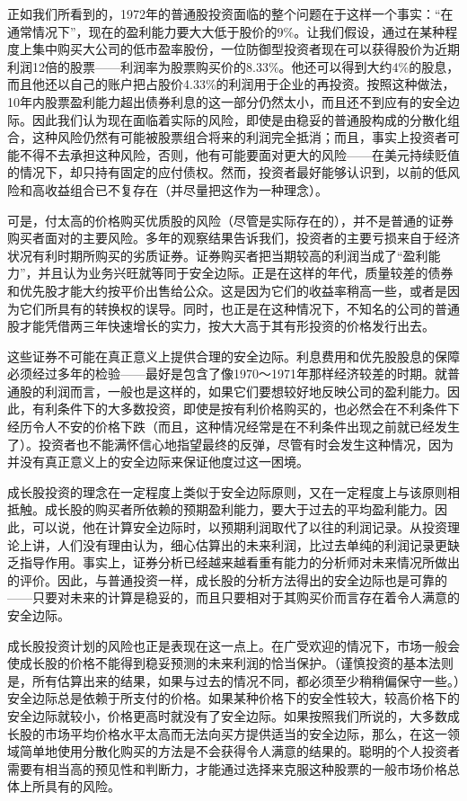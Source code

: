 \documentclass[12pt,oneside]{book}
\begin{document}
正如我们所看到的，1972年的普通股投资面临的整个问题在于这样一个事实：“在通常情况下”，现在的盈利能力要大大低于股价的9\%。让我们假设，通过在某种程度上集中购买大公司的低市盈率股份，一位防御型投资者现在可以获得股价为近期利润12倍的股票——利润率为股票购买价的8.33\%。他还可以得到大约4\%的股息，而且他还以自己的账户把占股价4.33\%的利润用于企业的再投资。按照这种做法，10年内股票盈利能力超出债券利息的这一部分仍然太小，而且还不到应有的安全边际。因此我们认为现在面临着实际的风险，即使是由稳妥的普通股构成的分散化组合，这种风险仍然有可能被股票组合将来的利润完全抵消；而且，事实上投资者可能不得不去承担这种风险，否则，他有可能要面对更大的风险——在美元持续贬值的情况下，却只持有固定的应付债权。然而，投资者最好能够认识到，以前的低风险和高收益组合已不复存在（并尽量把这作为一种理念）。

可是，付太高的价格购买优质股的风险（尽管是实际存在的），并不是普通的证券购买者面对的主要风险。多年的观察结果告诉我们，投资者的主要亏损来自于经济状况有利时期所购买的劣质证券。证券购买者把当期较高的利润当成了“盈利能力”，并且认为业务兴旺就等同于安全边际。正是在这样的年代，质量较差的债券和优先股才能大约按平价出售给公众。这是因为它们的收益率稍高一些，或者是因为它们所具有的转换权的误导。同时，也正是在这种情况下，不知名的公司的普通股才能凭借两三年快速增长的实力，按大大高于其有形投资的价格发行出去。

这些证券不可能在真正意义上提供合理的安全边际。利息费用和优先股股息的保障必须经过多年的检验——最好是包含了像1970～1971年那样经济较差的时期。就普通股的利润而言，一般也是这样的，如果它们要想较好地反映公司的盈利能力。因此，有利条件下的大多数投资，即使是按有利价格购买的，也必然会在不利条件下经历令人不安的价格下跌（而且，这种情况经常是在不利条件出现之前就已经发生了）。投资者也不能满怀信心地指望最终的反弹，尽管有时会发生这种情况，因为并没有真正意义上的安全边际来保证他度过这一困境。

成长股投资的理念在一定程度上类似于安全边际原则，又在一定程度上与该原则相抵触。成长股的购买者所依赖的预期盈利能力，要大于过去的平均盈利能力。因此，可以说，他在计算安全边际时，以预期利润取代了以往的利润记录。从投资理论上讲，人们没有理由认为，细心估算出的未来利润，比过去单纯的利润记录更缺乏指导作用。事实上，证券分析已经越来越看重有能力的分析师对未来情况所做出的评价。因此，与普通投资一样，成长股的分析方法得出的安全边际也是可靠的——只要对未来的计算是稳妥的，而且只要相对于其购买价而言存在着令人满意的安全边际。

成长股投资计划的风险也正是表现在这一点上。在广受欢迎的情况下，市场一般会使成长股的价格不能得到稳妥预测的未来利润的恰当保护。（谨慎投资的基本法则是，所有估算出来的结果，如果与过去的情况不同，都必须至少稍稍偏保守一些。）安全边际总是依赖于所支付的价格。如果某种价格下的安全性较大，较高价格下的安全边际就较小，价格更高时就没有了安全边际。如果按照我们所说的，大多数成长股的市场平均价格水平太高而无法向买方提供适当的安全边际，那么，在这一领域简单地使用分散化购买的方法是不会获得令人满意的结果的。聪明的个人投资者需要有相当高的预见性和判断力，才能通过选择来克服这种股票的一般市场价格总体上所具有的风险。
\end{document}

